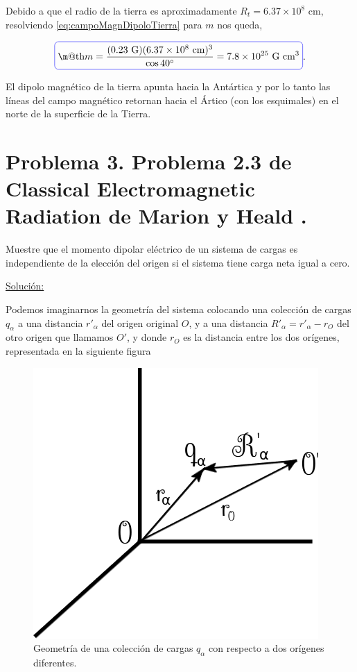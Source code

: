 \documentclass[a4paper,11pt]{article}
\makeatletter
\numberwithin{equation}{section}
\newcommand*{\boxcolor}{blue}
\renewcommand{\boxed}[1]{\textcolor{\boxcolor}{%
\tikz[baseline={([yshift=-1ex]current bounding box.center)}] \node [rectangle, minimum width=1ex,rounded corners,draw] {\normalcolor\m@th$\displaystyle#1$};}}
\makeatother
\begin{document}
Debido a que el radio de la tierra es aproximadamente $R_t = 6.37 \times 10^8$ cm, 
resolviendo \eqref{eq:campoMagnDipoloTierra} para $m$ nos queda, 

\begin{equation}
 \boxed{m = \frac{(0.23 \text{ G})(6.37 \times 10^8 \text{ cm})^3}{\cos{40^\circ}} = 
 7.8 \times 10^{25} \text{ G}\text{ cm}^3}.
\end{equation}

El dipolo magnético de la tierra apunta hacia la Antártica y por lo tanto las líneas 
del campo magnético retornan hacia el Ártico (con los esquimales) en el norte de la 
superficie de la Tierra.

\section{Problema 3. Problema 2.3 de Classical Electromagnetic Radiation
de Marion y Heald \cite{marion2}.}

Muestre que el momento dipolar eléctrico de un sistema de cargas es independiente 
de la elección del origen si el sistema tiene carga neta igual a cero.

\vspace{.3cm}

\underline{Solución:} \vspace{.3cm}

Podemos imaginarnos la geometría del sistema colocando una colección de cargas 
$q_\alpha$ a una distancia $r'_\alpha$ del origen original $O$, y a una distancia 
$R'_\alpha = r'_\alpha - r_O$ del otro origen que llamamos $O'$, y donde $r_O$ es 
la distancia entre los dos orígenes, representada en la siguiente figura 

\begin{figure}[H]
 \center 
 \includegraphics[scale=0.5]{problema3fig1}
 \caption{Geometría de una colección de cargas $q_\alpha$ con respecto a dos 
 orígenes diferentes.}
 \label{fig:problema3fig1}
\end{figure}
\end{document}
